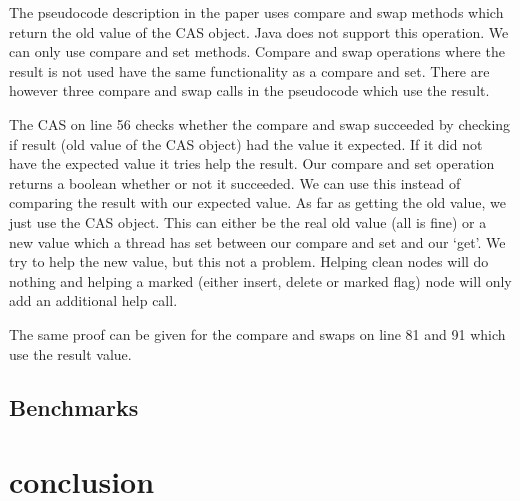 \documentclass[10pt,a4paper]{article}
\begin{document}
The pseudocode description in the paper uses compare and swap methods which return the old value of the CAS object. Java does not support this operation. We can only use compare and set methods. Compare and swap operations where the result is not used have the same functionality as a compare and set. There are however three compare and swap calls in the pseudocode which use the result.

The CAS on line 56 checks whether the compare and swap succeeded by checking if result (old value of the CAS object) had the value it expected. If it did not have the expected value it tries help the result. Our compare and set operation returns a boolean whether or not it succeeded. We can use this instead of comparing the result with our expected value. As far as getting the old value, we just use the CAS object. This can either be the real old value (all is fine) or a new value which a thread has set between our compare and set and our `get'. We try to help the new value, but this not a problem. Helping clean nodes will do nothing and helping a marked (either insert, delete or marked flag) node will only add an additional help call.

The same proof can be given for the compare and swaps on line 81 and 91 which use the result value.





\subsection{Benchmarks}

\section{conclusion}
\end{document}
